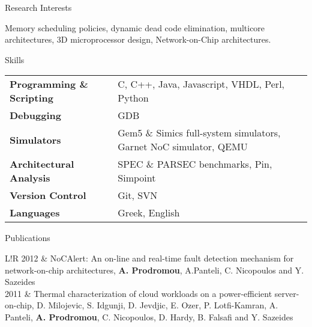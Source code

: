 \documentclass{resume} %
\newcommand\VRule{\color{lightgray}\vrule width 0.5pt}
\begin{document}

\begin{rSection}{Research Interests}

Memory scheduling policies, dynamic dead code elimination, multicore architectures, 3D microprocessor design, Network-on-Chip architectures. \\

\end{rSection}

\begin{rSection}{Skills}

\begin{tabular}{ @{} >{\bfseries}l @{\hspace{6ex}} l }
Programming \& Scripting & C, C++, Java, Javascript, VHDL, Perl, Python \\
Debugging & GDB \\
Simulators & Gem5 \& Simics full-system simulators, Garnet NoC simulator, QEMU \\
Architectural Analysis & SPEC \& PARSEC benchmarks, Pin, Simpoint \\
Version Control & Git, SVN \\
Languages & Greek, English\\
\end{tabular}

\end{rSection}



\begin{rSection}{Publications}

\begin{tabular}{L!{\VRule}R}
2012 & NoCAlert: An on-line and real-time fault detection mechanism for network-on-chip architectures, \textbf{A. Prodromou}, A.Panteli, C. Nicopoulos and Y. Sazeides\\[5pt]
2011 & Thermal characterization of cloud workloads on a power-efficient server-on-chip, D. Milojevic, S. Idgunji, D. Jevdjic, E. Ozer, P. Lotfi-Kamran, A. Panteli, \textbf{A. Prodromou}, C. Nicopoulos, D. Hardy, B. Falsafi and Y. Sazeides\\[5pt]
\end{tabular}

\end{rSection}
\end{document}
